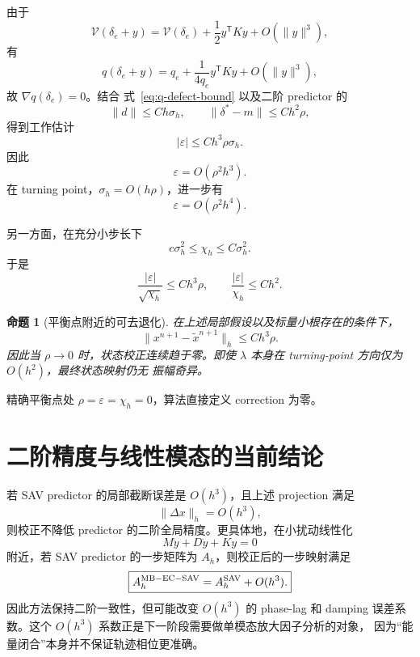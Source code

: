 \documentclass[UTF8,11pt,a4paper]{ctexart}
\newtheorem{proposition}[theorem]{命题}
\theoremstyle{definition}
\theoremstyle{remark}
\newcommand{\T}{\mathsf{T}}
\newcommand{\V}{\mathcal V}
\newcommand{\wt}{\widetilde}
\begin{document}
由于
\[
 \V(\delta_e+y)
 =
 \V(\delta_e)+\frac12y^\T Ky+O(\|y\|^3),
\]
有
\[
 q(\delta_e+y)
 =
 q_e+\frac{1}{4q_e}y^\T Ky+O(\|y\|^3),
\]
故 \(\nabla q(\delta_e)=0\)。结合
式~\eqref{eq:q-defect-bound} 以及二阶 predictor 的
\[
 \|d\|\le Ch\sigma_h,
 \qquad
 \|\delta^*-m\|\le Ch^2\rho,
\]
得到工作估计
\begin{equation}
 \boxed{
 |\varepsilon|
 \le
 C h^3\rho\sigma_h.}
 \label{eq:near-equilibrium-epsilon}
\end{equation}
因此
\[
 \varepsilon=O(\rho^2h^3).
\]
在 turning point，\(\sigma_h=O(h\rho)\)，进一步有
\begin{equation}
 \boxed{
 \varepsilon=O(\rho^2h^4).}
 \label{eq:near-equilibrium-turning}
\end{equation}

另一方面，在充分小步长下
\begin{equation}
 c\sigma_h^2\le\chi_h\le C\sigma_h^2.
 \label{eq:chi-sigma}
\end{equation}
于是
\begin{equation}
 \frac{|\varepsilon|}{\sqrt{\chi_h}}
 \le Ch^3\rho,
 \qquad
 \frac{|\varepsilon|}{\chi_h}
 \le Ch^2.
 \label{eq:ratio-bounds}
\end{equation}

\begin{proposition}[平衡点附近的可去退化]
在上述局部假设以及标量小根存在的条件下，
\begin{equation}
 \boxed{
 \|x^{n+1}-\wt x^{n+1}\|_h
 \le Ch^3\rho.}
 \label{eq:near-equilibrium-correction}
\end{equation}
因此当 \(\rho\to0\) 时，状态校正连续趋于零。即使
\(\lambda\) 本身在 turning-point 方向仅为 \(O(h^2)\)，最终状态映射仍无
振幅奇异。
\end{proposition}

精确平衡点处
\(
 \rho=\varepsilon=\chi_h=0
\)，算法直接定义 correction 为零。

\section{二阶精度与线性模态的当前结论}

若 SAV predictor 的局部截断误差是 \(O(h^3)\)，且上述 projection 满足
\[
 \|\Delta x\|_h=O(h^3),
\]
则校正不降低 predictor 的二阶全局精度。更具体地，在小扰动线性化
\[
 M\ddot y+D\dot y+Ky=0
\]
附近，若 SAV predictor 的一步矩阵为 \(A_h\)，则校正后的一步映射满足
\begin{equation}
 \boxed{
 A_h^{\rm MB-EC-SAV}
 =
 A_h^{\rm SAV}+O(h^3).}
 \label{eq:linear-map}
\end{equation}
因此方法保持二阶一致性，但可能改变 \(O(h^3)\) 的 phase-lag 和 damping
误差系数。这个 \(O(h^3)\) 系数正是下一阶段需要做单模态放大因子分析的对象，
因为“能量闭合”本身并不保证轨迹相位更准确。
\end{document}
